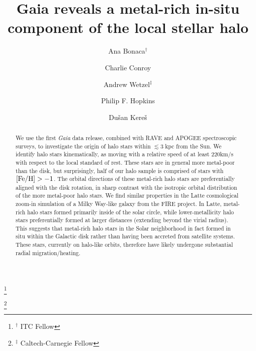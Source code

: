 \documentclass[apj, twocolappendix, numberedappendix, appendixfloats]{emulateapj}
\begin{document}
\title{Gaia reveals a metal-rich in-situ component of the local stellar halo}
\author{Ana Bonaca$^\dagger$}\thanks{$^\dagger$ ITC Fellow}
\author{Charlie Conroy}
\author{Andrew Wetzel$^\ddagger$}\thanks{$^\ddagger$ Caltech-Carnegie Fellow}
\author{Philip F. Hopkins}
\author{Du\v san Kere\v s}


\begin{abstract}
We use the first \emph{Gaia} data release, combined with RAVE and APOGEE spectroscopic surveys, to investigate the origin of halo stars within $\lesssim3\;$kpc from the Sun.
We identify halo stars kinematically, as moving with a relative speed of at least 220\;km/s with respect to the local standard of rest.
These stars are in general more metal-poor than the disk, but surprisingly, half of our halo sample is comprised of stars with $\rm[Fe/H]>-1$.
The orbital directions of these metal-rich halo stars are preferentially aligned with the disk rotation, in sharp contrast with the isotropic orbital distribution of the more metal-poor halo stars.
We find similar properties in the Latte cosmological zoom-in simulation of a Milky Way-like galaxy from the FIRE project.
In Latte, metal-rich halo stars formed primarily inside of the solar circle, while lower-metallicity halo stars preferentially formed at larger distances (extending beyond the virial radius).
This suggests that metal-rich halo stars in the Solar neighborhood in fact formed in situ within the Galactic disk rather than having been accreted from satellite systems.
These stars, currently on halo-like orbits, therefore have likely undergone substantial radial migration/heating.
\end{abstract}
\maketitle
\end{document}
